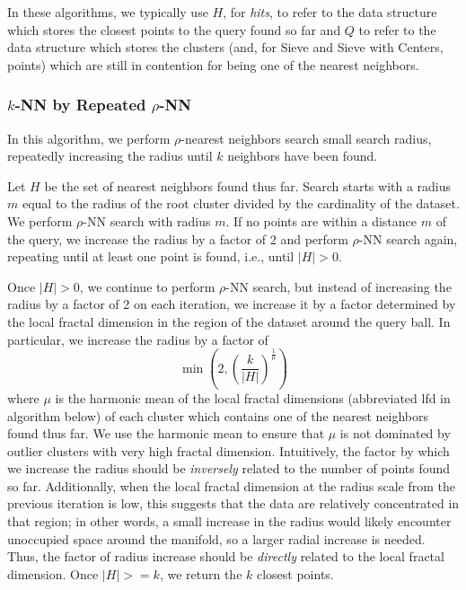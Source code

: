 In these algorithms, we typically use $H$, for \emph{hits}, to refer to the data structure which stores the closest points to the query found so far and
$Q$ to refer to the data structure which stores the clusters (and, for Sieve and Sieve with Centers, points) which are still in contention for being one of the nearest neighbors.


\subsubsection{\texorpdfstring{$k$}{k}-NN by Repeated \texorpdfstring{$\rho$}{p}-NN}
\label{subsubsec:methods:knn-search:repeated-rnn}


In this algorithm, we perform $\rho$-nearest neighbors search small search radius, repeatedly increasing the radius until $k$ neighbors
have been found.

Let $H$ be the set of nearest neighbors found thus far.
Search starts with a radius $m$ equal to the radius of the root cluster divided by
the cardinality of the dataset. We perform $\rho$-NN search with radius $m$. 
If no points are within a distance $m$ of the query, we increase the radius by a factor of
2 and perform $\rho$-NN search again, repeating until at least one point is found, i.e., 
until $|H| > 0$.


Once $|H| > 0$, we continue to perform $\rho$-NN search, but instead of 
increasing the radius by a factor of 2 on each iteration, we increase it by a factor determined 
by the local fractal dimension in the region of the dataset around the query ball. 
In particular, 
we increase the radius by a factor of 
\begin{equation} \min \left(2, \left({\frac{k}{|H|}}\right)^{\frac{1}{\mu}}\right) \label{2} \end{equation}
where $\mu$ is the harmonic mean of the local fractal dimensions (abbreviated lfd in algorithm below) of 
each cluster which contains one of the nearest neighbors found thus far. We use the harmonic mean to 
ensure that $\mu$ is not dominated by outlier clusters with very high fractal dimension. 
Intuitively, the factor by which we increase the radius should be \emph{inversely} related to the number of points found so far. 
Additionally, when the local fractal dimension at the radius scale from the previous iteration is low, this suggests that the data 
are relatively concentrated in that region; in other words, a small increase in the radius would likely encounter unoccupied space around the manifold, so a larger radial increase is needed. Thus, the factor of radius increase should be \emph{directly} related to the 
local fractal dimension. Once $|H| >= k$, we return the $k$ closest points.

